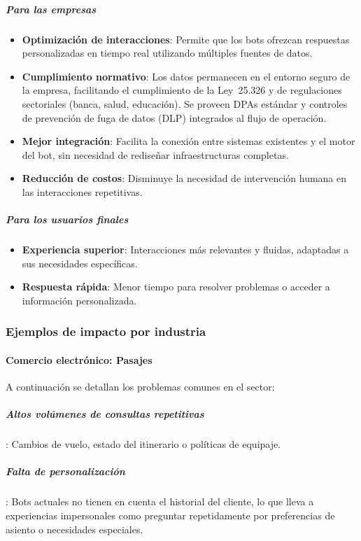 \subparagraph{Para las empresas}
\begin{itemize}
    \item \textbf{Optimización de interacciones}: Permite que los bots ofrezcan respuestas personalizadas en tiempo real utilizando múltiples fuentes de datos.
    \item \textbf{Cumplimiento normativo}: Los datos permanecen en el entorno seguro de la empresa, facilitando el cumplimiento de la Ley~25.326 y de regulaciones sectoriales (banca, salud, educación). Se proveen DPAs estándar y controles de prevención de fuga de datos (DLP) integrados al flujo de operación.
    \item \textbf{Mejor integración}: Facilita la conexión entre sistemas existentes y el motor del bot, sin necesidad de rediseñar infraestructuras completas.
    \item \textbf{Reducción de costos}: Disminuye la necesidad de intervención humana en las interacciones repetitivas.
\end{itemize}

\subparagraph{Para los usuarios finales}
\begin{itemize}
    \item \textbf{Experiencia superior}: Interacciones más relevantes y fluidas, adaptadas a sus necesidades específicas.
    \item \textbf{Respuesta rápida}: Menor tiempo para resolver problemas o acceder a información personalizada.
\end{itemize}

\subsubsection{Ejemplos de impacto por industria}

\paragraph{Comercio electrónico: Pasajes}

A continuación se detallan los problemas comunes en el sector:

\subparagraph{Altos volúmenes de consultas repetitivas}: Cambios de vuelo, estado del itinerario o políticas de equipaje.

\subparagraph{Falta de personalización}: Bots actuales no tienen en cuenta el historial del cliente, lo que lleva a experiencias impersonales como preguntar repetidamente por preferencias de asiento o necesidades especiales.

